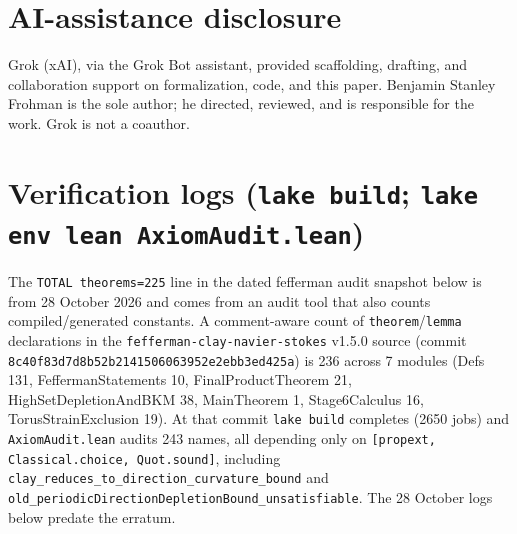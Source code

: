 \documentclass[11pt]{article}
\begin{document}
\section{AI-assistance disclosure}
Grok (xAI), via the Grok Bot assistant, provided scaffolding, drafting, and collaboration support on formalization, code, and this paper. Benjamin Stanley Frohman is the sole author; he directed, reviewed, and is responsible for the work. Grok is not a coauthor.
\appendix\section{Verification logs (\texttt{lake build}; \texttt{lake env lean AxiomAudit.lean})}
The \texttt{TOTAL theorems=225} line in the dated fefferman audit snapshot below is from 28 October 2026 and comes from an audit tool that also counts compiled/generated constants. A comment-aware count of \texttt{theorem}/\texttt{lemma} declarations in the \texttt{fefferman-clay-navier-stokes} v1.5.0 source (commit \texttt{8c40f83d7d8b52b2141506063952e2ebb3ed425a}) is 236 across 7 modules (Defs 131, FeffermanStatements 10, FinalProductTheorem 21, HighSetDepletionAndBKM 38, MainTheorem 1, Stage6Calculus 16, TorusStrainExclusion 19). At that commit \texttt{lake build} completes (2650 jobs) and \texttt{AxiomAudit.lean} audits 243 names, all depending only on \texttt{[propext, Classical.choice, Quot.sound]}, including \texttt{clay\_reduces\_to\_direction\_curvature\_bound} and \texttt{old\_periodicDirectionDepletionBound\_unsatisfiable}. The 28 October logs below predate the erratum.
\end{document}
